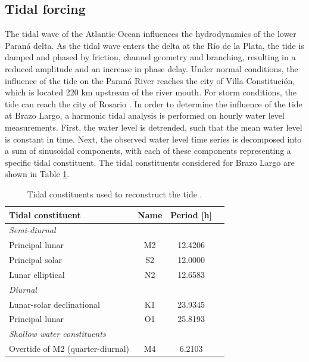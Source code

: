 \subsection{Tidal forcing }
\label{sec: tidal forcing}
The tidal wave of the Atlantic Ocean influences the hydrodynamics of the lower Paraná delta. As the tidal wave enters the delta at the Río de la Plata, the tide is damped and phased by friction, channel geometry and branching, resulting in a reduced amplitude and an increase in phase delay. Under normal conditions, the influence of the tide on the Paraná River reaches the city of Villa Constitución, which is located 220 km upstream of the river mouth. For storm conditions, the tide can reach the city of Rosario \autocite{balayCausesPeriodicityLarge2018}. In order to determine the influence of the tide at Brazo Largo, a harmonic tidal analysis is performed on hourly water level measurements. First, the water level is detrended, such that the mean water level is constant in time. Next, the observed water level time series is decomposed into a sum of sinusoidal components, with each of these components representing a specific tidal constituent. The tidal constituents considered for Brazo Largo are shown in Table \ref{tab: constituents}.

\begin{table}[H]
\centering
\caption{Tidal constituents used to reconstruct the tide
\autocite{apelPrinciplesOceanPhysics1987}.}
\label{tab: constituents}
\begin{tabular}{lccc}
\hline
Tidal constituent & Name & Period [h] \\
\hline
\multicolumn{3}{l}{\textit{Semi-diurnal}} \\
\hspace{1em}Principal lunar & M2 & 12.4206\\
\hspace{1em}Principal solar & S2 & 12.0000 \\
\hspace{1em}Lunar elliptical & N2 & 12.6583\\
\hline
\multicolumn{3}{l}{\textit{Diurnal}} \\
\hspace{1em}Lunar-solar declinational & K1 & 23.9345  \\
\hspace{1em}Principal lunar & O1 & 25.8193  \\
\hline
\multicolumn{3}{l}{\textit{Shallow water constituents}} \\
\hspace{1em}Overtide of M2 (quarter-diurnal) & M4 & 6.2103  \\
\hline
\end{tabular}
\end{table}

